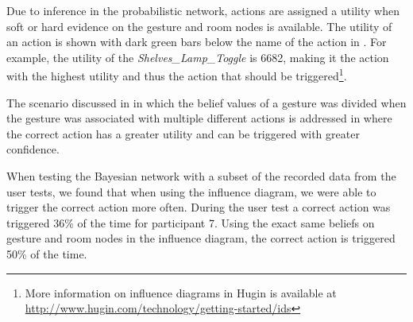 Due to inference in the probabilistic network, actions are assigned a utility when soft or hard evidence on the gesture and room nodes is available. The utility of an action is shown with dark green bars below the name of the action in . For example, the utility of the \emph{Shelves\_Lamp\_Toggle} is 6682, making it the action with the highest utility and thus the action that should be triggered\footnote{More information on influence diagrams in Hugin is available at \url{http://www.hugin.com/technology/getting-started/ids}}.

The scenario discussed in  in which the belief values of a gesture was divided when the gesture was associated with multiple different actions is addressed in  where the correct action has a greater utility and can be triggered with greater confidence.

When testing the Bayesian network with a subset of the recorded data from the user tests, we found that when using the influence diagram, we were able to trigger the correct action more often. During the user test a correct action was triggered 36\% of the time for participant 7. Using the exact same beliefs on gesture and room nodes in the influence diagram, the correct action is triggered 50\% of the time.


